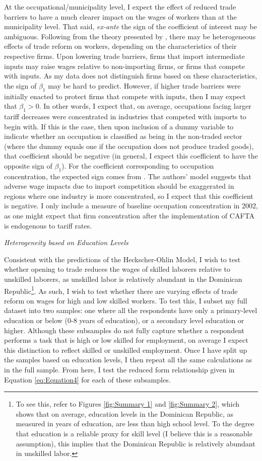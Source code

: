 At the occupational/municipality level, I expect the effect of reduced trade barriers to have a 
much clearer impact on the wages of workers than at the municipality level. That said, 
\textit{ex-ante} the sign of the coefficient of interest may be ambiguous. Following from the 
theory presented by \citet{amiti}, there may be heterogeneous effects of trade reform on workers,
depending on the characteristics of their respective firms. Upon lowering trade barriers, firms 
that import intermediate inputs may raise wages relative to non-importing firms, or firms that
compete with inputs. As my data does not distinguish firms based on these characteristics, the sign
of $\beta_1$ may be hard to predict. However, if higher trade barriers were initially enacted to
protect firms that compete with inputs, then I may expect that $\beta_1>0$. In other words, I expect
that, on average, occupations facing larger tariff decreases were concentrated in industries that
competed with imports to begin with. If this is the case, then upon inclusion of a dummy variable
to indicate whether an occupation is classified as being in the non-traded sector (where
the dummy equals one if the occupation does not produce traded goods), that coefficient
should be negative (in general, I expect this coefficient to have the opposite sign of $\beta_1$).
For the coefficient corresponding to occupation concentration, the expected sign comes from
\citet{holmes1}. The authors' model suggests that adverse wage impacts due to import competition 
should be exaggerated in regions where one industry is more concentrated, so I expect that
this coefficient is negative. I only include a measure of baseline occupation concentration in 2002,
as one might expect that firm concentration after the implementation of CAFTA is endogenous to 
tariff rates.

\textit{Heterogeneity based on Education Levels}

Consistent with the predictions of the Heckscher-Ohlin Model, I wish to test whether opening to
trade reduces the wages of skilled laborers relative to unskilled laborers, as unskilled labor
is relatively abundant in the Dominican Republic\footnote{To see this, refer to Figures \ref{fig:Summary 1}
and \ref{fig:Summary 2}, which shows that on average, education levels in the Dominican Republic,
as measured in years of education, are less than high school level. To the degree that education
is a reliable proxy for skill level (I believe this is a reasonable assumption), this implies that 
the Dominican Republic is relatively abundant in unskilled labor.}. 
As such, I wish to test whether there are varying effects of trade reform on wages for high and 
low skilled workers. To test this, I subset my full dataset into two samples: one where all
the respondents have only a primary-level education or below (0-8 years of education), or
a secondary level education or higher. Although these subsamples do not fully capture whether a respondent
performs a task that is high or low skilled for employment, on average I expect this distinction to
reflect skilled or unskilled employment. Once I have split up the samples based on education levels,
I then repeat all the same calculations as in the full sample. From here, I test the reduced form 
relationship given in Equation \ref{eq:Equation4} for each of these subsamples. 